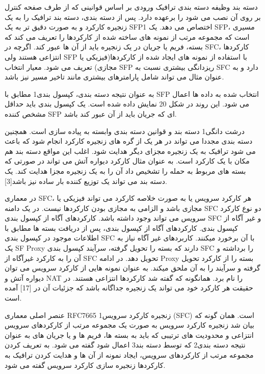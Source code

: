 
دسته بند وظیفه دسته بندی ترافیک ورودی بر اساس قوانینی که از طرف صفحه کنترل بر روی آن نصب می شود را برعهده دارد. پس از دسته بندی، دسته بند ترافیک را به یک زنجیره کارکرد و به صورت دقیق تر به یک SFP1  اختصاص می دهد. یک SFP، مسیری است که مجموعه مرتب از نمونه های ساخته شده از کارکردها را تعریف می کند که بسته، فریم یا جریان در یک زنجیره باید از آن ها عبور کند. اگرچه در SFC، کارکردها انتزاعی هستند ولی SFP با استفاده از نمونه های ایجاد شده از کارکردها(فیزیکی یا مجازی) تعریف می شود. معیار انتخاب SFP ریزدانگی بیشتری نسبت به SFC دارد و به عنوان مثال می تواند شامل پارامترهای بیشتری مانند تاخیر مسیر نیز باشد.

به عنوان نتیجه دسته بندی، کپسول بندی1 مطابق با SFP انتخاب شده به داده ها اعمال می شود. این روند در شکل 20 نمایش داده شده است. یک کپسول بندی باید حداقل مشخص کننده SFP ای که جریان باید از آن عبور کند باشد.

درشت دانگی1 دسته بند و قوانین دسته بندی وابسته به پیاده سازی است. همچنین دسته بندی مجددا می تواند در هر یک از گره های زنجیره کارکرد انجام شود که باعث می شود ترافیک به یک زنجیره مجزای دیگر هدایت شود. اغلب این مواقع دسته بند هم مکان با یک کارکرد است. به عنوان مثال کارکرد دیواره آتش می تواند در صورتی که بسته های مربوط به حمله را تشخیص داد آن را به یک زنجیره مجزا هدایت کند. یک دسته بند می تواند یک توزیع کننده بار ساده نیز باشد[3].


در معماری SFC، هر کارکرد سرویس یا به صورت خلاصه کارکرد می تواند فیزیکی یا مجازی باشد و الزامی به مجازی بودن کارکردها نیست. در یک دامنه SFC دو نوع کارکرد سرویس می تواند وجود داشته باشد. کارکردهای آگاه از کپسول بندی SFC و غیر آگاه از کپسول بندی. کارکردهای آگاه از کپسول بندی، پس از دریافت بسته ها مطابق با اطلاعات موجود در کپسول بندی SFC با آن برخورد میکنند. کاربردهای غیر آگاه نیاز به یک SF Proxy دارند که بسته را تحویل گرفته، سرآیند کپسول بندی SFC را برداشته و آن را به کارکرد غیرآگاه از SFC تحویل دهد. در ادامه Proxy بسته را از کارکرد تحویل گرفته و سرآیند را به آن ملحق میکند. به عنوان نمونه هایی از کارکرد سرویس می توان دیواره آتش و NAT را نام برد. همانگونه که گفته شد کارکردها انتزاعی هستند. در حقیقت هر کارکرد خود می تواند یک زنجیره جداگانه باشد که جزئیات آن در [17] آمده است.


عنصر اصلی معماری RFC7665 زنجیره کارکرد سرویس1 (SFC) است. همان گونه که بیان شد زنجیره کارکرد سرویس به صورت یک مجموعه مرتب از کارکردهای سرویس انتزاعی و محدودیت های ترتیبی که باید به بسته ها، فریم ها و یا جریان های به عنوان نتیجه دسته بندی2 که توسط دسته بند3 اعمال شود گفته می شود. به تعریف کردن مجموعه مرتب از کارکردهای سرویس، ایجاد نمونه از آن ها و هدایت کردن ترافیک به کارکردها زنجیره سازی کارکرد سرویس گفته می شود.

